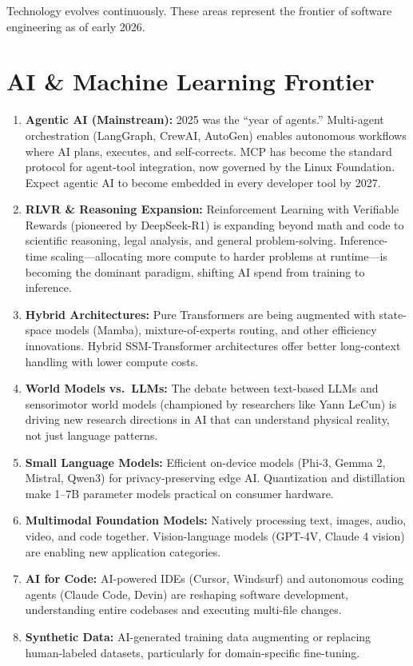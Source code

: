 \documentclass[11pt, a4paper, oneside]{report}
\begin{document}
{{{{{{{{{{{{Technology evolves continuously. These areas represent the frontier of software engineering as of early 2026.

\section[AI/ML Frontier]{AI \& Machine Learning Frontier}

\begin{enumerate}[leftmargin=*]
\item \textbf{Agentic AI (Mainstream):} 2025 was the ``year of agents.'' Multi-agent orchestration (LangGraph, CrewAI, AutoGen) enables autonomous workflows where AI plans, executes, and self-corrects. MCP has become the standard protocol for agent-tool integration, now governed by the Linux Foundation. Expect agentic AI to become embedded in every developer tool by 2027.
\item \textbf{RLVR \& Reasoning Expansion:} Reinforcement Learning with Verifiable Rewards (pioneered by DeepSeek-R1) is expanding beyond math and code to scientific reasoning, legal analysis, and general problem-solving. Inference-time scaling---allocating more compute to harder problems at runtime---is becoming the dominant paradigm, shifting AI spend from training to inference.
\item \textbf{Hybrid Architectures:} Pure Transformers are being augmented with state-space models (Mamba), mixture-of-experts routing, and other efficiency innovations. Hybrid SSM-Transformer architectures offer better long-context handling with lower compute costs.
\item \textbf{World Models vs.\ LLMs:} The debate between text-based LLMs and sensorimotor world models (championed by researchers like Yann LeCun) is driving new research directions in AI that can understand physical reality, not just language patterns.
\item \textbf{Small Language Models:} Efficient on-device models (Phi-3, Gemma 2, Mistral, Qwen3) for privacy-preserving edge AI. Quantization and distillation make 1--7B parameter models practical on consumer hardware.
\item \textbf{Multimodal Foundation Models:} Natively processing text, images, audio, video, and code together. Vision-language models (GPT-4V, Claude 4 vision) are enabling new application categories.
\item \textbf{AI for Code:} AI-powered IDEs (Cursor, Windsurf) and autonomous coding agents (Claude Code, Devin) are reshaping software development, understanding entire codebases and executing multi-file changes.
\item \textbf{Synthetic Data:} AI-generated training data augmenting or replacing human-labeled datasets, particularly for domain-specific fine-tuning.
\end{enumerate}

}}}}}}}}}}}}
\end{document}
